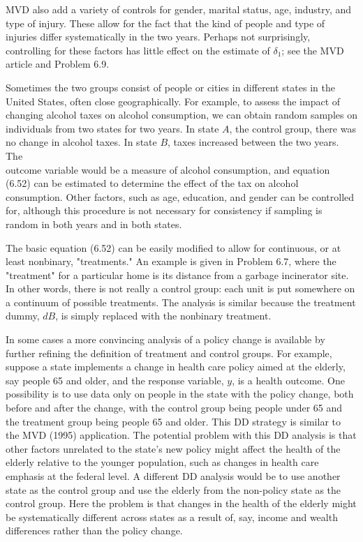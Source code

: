 \documentclass[10pt]{article}
\begin{document}
MVD also add a variety of controls for gender, marital status, age, industry, and type of injury. These allow for the fact that the kind of people and type of injuries differ systematically in the two years. Perhaps not surprisingly, controlling for these factors has little effect on the estimate of $\delta_{1}$; see the MVD article and Problem 6.9.

Sometimes the two groups consist of people or cities in different states in the United States, often close geographically. For example, to assess the impact of changing alcohol taxes on alcohol consumption, we can obtain random samples on individuals from two states for two years. In state $A$, the control group, there was no change in alcohol taxes. In state $B$, taxes increased between the two years. The\\
outcome variable would be a measure of alcohol consumption, and equation (6.52) can be estimated to determine the effect of the tax on alcohol consumption. Other factors, such as age, education, and gender can be controlled for, although this procedure is not necessary for consistency if sampling is random in both years and in both states.

The basic equation (6.52) can be easily modified to allow for continuous, or at least nonbinary, "treatments." An example is given in Problem 6.7, where the "treatment" for a particular home is its distance from a garbage incinerator site. In other words, there is not really a control group: each unit is put somewhere on a continuum of possible treatments. The analysis is similar because the treatment dummy, $d B$, is simply replaced with the nonbinary treatment.

In some cases a more convincing analysis of a policy change is available by further refining the definition of treatment and control groups. For example, suppose a state implements a change in health care policy aimed at the elderly, say people 65 and older, and the response variable, $y$, is a health outcome. One possibility is to use data only on people in the state with the policy change, both before and after the change, with the control group being people under 65 and the treatment group being people 65 and older. This DD strategy is similar to the MVD (1995) application. The potential problem with this DD analysis is that other factors unrelated to the state's new policy might affect the health of the elderly relative to the younger population, such as changes in health care emphasis at the federal level. A different DD analysis would be to use another state as the control group and use the elderly from the non-policy state as the control group. Here the problem is that changes in the health of the elderly might be systematically different across states as a result of, say, income and wealth differences rather than the policy change.
\end{document}

